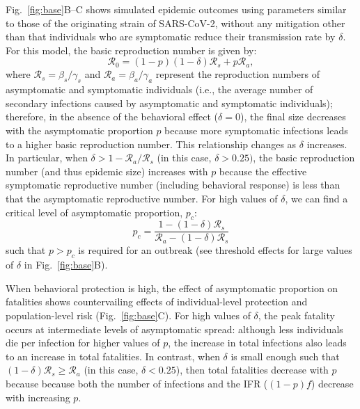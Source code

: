 \documentclass[12pt]{article}
\newcommand{\fref}[1]{Fig.~\ref{fig:#1}}
\newcommand{\RR}{\ensuremath{{\mathcal R}}\xspace}
\begin{document}
\fref{base}B--C shows simulated epidemic outcomes using parameters similar to those of the originating strain of SARS-CoV-2, without any mitigation other than that individuals who are symptomatic reduce their transmission rate by $\delta$. 
For this model, the basic reproduction number is given by:
\begin{equation}
\RR_0 = (1-p) (1-\delta) \RR_s + p \RR_a,
\end{equation}
where $\RR_s = \beta_s/\gamma_s$ and $\RR_a = \beta_a/\gamma_a$ represent the reproduction numbers of asymptomatic and symptomatic individuals (i.e., the average number of secondary infections caused by asymptomatic and symptomatic individuals);
therefore, in the absence of the behavioral effect ($\delta=0$), the final size decreases with the asymptomatic proportion $p$ because more symptomatic infections leads to a higher basic reproduction number.
This relationship changes as $\delta$ increases.
In particular, when $\delta > 1-\RR_a/\RR_s$ (in this case, $\delta > 0.25)$, the basic reproduction number (and thus epidemic size) increases with $p$ because the effective symptomatic reproductive number (including behavioral response) is less than that the asymptomatic reproductive number.
For high values of $\delta$, we can find a critical level of asymptomatic proportion, $p_c$:
\begin{equation}
    p_c = \frac{1 - (1-\delta) \RR_s}{\RR_a - (1-\delta) \RR_s}
\end{equation}
such that $p>p_c$ is required for an outbreak (see threshold effects for large values of $\delta$ in \fref{base}B).

When behavioral protection is high, the effect of asymptomatic proportion on fatalities shows countervailing effects of individual-level protection and population-level risk (\fref{base}C).
For high values of $\delta$, the peak fatality occurs at intermediate levels of asymptomatic spread:
although less individuals die per infection for higher values of $p$, the increase in total infections also leads to an increase in total fatalities.
In contrast, when $\delta$ is small enough such that $(1-\delta) \RR_s \geq \RR_a$ (in this case, $\delta < 0.25$), then total fatalities decrease with $p$ because because both the number of infections and the IFR ($(1-p)f$) decrease with increasing $p$.
\end{document}
